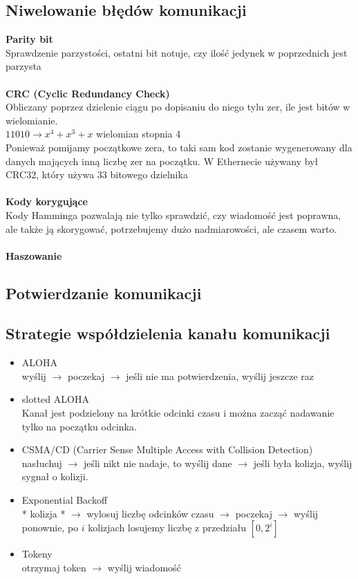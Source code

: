 \documentclass[]{article}
\begin{document}
\subsection{Niwelowanie błędów komunikacji}
\textbf{Parity bit} \\
Sprawdzenie parzystości, ostatni bit notuje, czy ilość jedynek w poprzednich jest parzysta \\ \\
\textbf{CRC (Cyclic Redundancy Check)} \\
Obliczany poprzez dzielenie ciągu po dopisaniu do niego tylu zer, ile jest bitów w wielomianie. \\
$11010 \rightarrow x^4 + x^3 + x$ wielomian stopnia 4 \\
Ponieważ pomijamy początkowe zera, to taki sam kod zostanie wygenerowany dla danych mających inną liczbę zer na początku. W Ethernecie używany był CRC32, który używa 33 bitowego dzielnika \\ \\
\textbf{Kody korygujące} \\
Kody Hamminga pozwalają nie tylko sprawdzić, czy wiadomość jest poprawna, ale także ją skorygować, potrzebujemy dużo nadmiarowości, ale czasem warto.\\
\\
\textbf{Haszowanie}
\subsection{Potwierdzanie komunikacji}
\subsection{Strategie współdzielenia kanału komunikacji}
\begin{itemize}
    \item ALOHA \\
    wyślij $\rightarrow$ poczekaj $\rightarrow$ jeśli nie ma potwierdzenia, wyślij jeszcze raz
    \item slotted ALOHA \\
    Kanał jest podzielony na krótkie odcinki czasu i można zacząć nadawanie tylko na początku odcinka.
    \item CSMA/CD (Carrier Sense Multiple Access with Collision Detection) \\
    nasłuchuj $\rightarrow$ jeśli nikt nie nadaje, to wyślij dane $\rightarrow$ jeśli była kolizja, wyślij sygnał o kolizji.
    \item Exponential Backoff \\
    * kolizja * $\rightarrow$ wylosuj liczbę odcinków czasu $\rightarrow$ poczekaj $\rightarrow$ wyślij ponownie, po $i$ kolizjach losujemy liczbę z przedziału $[0, 2^i]$
    \item Tokeny \\
    otrzymaj token $\rightarrow$ wyślij wiadomość
\end{itemize}
\end{document}
